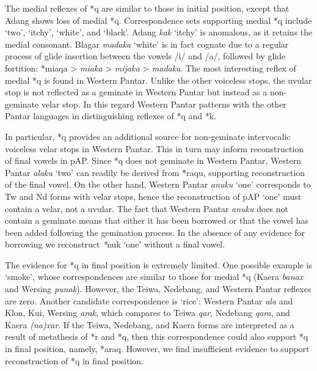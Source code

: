 The medial reflexes of *q are similar to those in initial position, except that Adang shows loss of medial *q. Correspondence sets supporting medial *q include {\textquoteleft}two{\textquoteright}, {\textquoteleft}itchy{\textquoteright}, {\textquoteleft}white{\textquoteright}, and {\textquoteleft}black{\textquoteright}. Adang \textit{kak }{\textquoteleft}itchy{\textquoteright} is anomalous, as it retains the medial consonant. Blagar \textit{mad}\textit{{\textyogh}}\textit{aka} {\textquoteleft}white{\textquoteright} is in fact cognate due to a regular process of glide insertion between the vowels /i/ and /a/, followed by glide fortition: *miaqa {\textgreater} \textit{miaka} {\textgreater} \textit{mijaka} {\textgreater}  \textit{mad}\textit{{\textyogh}}\textit{aka}. The most interesting reflex of medial *q is found in Western Pantar. Unlike the other voiceless stops, the uvular stop is not reflected as a geminate in Western Pantar but instead as a non-geminate velar stop. In this regard Western Pantar patterns 
with the other Pantar languages in distinguishing reflexes of *q and *k.   

In particular, *q provides an additional source for non-geminate intervocalic voiceless velar stops in Western Pantar. This in turn may inform reconstruction of final vowels in pAP. Since *q does not geminate in Western Pantar, Western Pantar \textit{alaku} {\textquoteleft}two{\textquoteright} can readily be derived from *raqu, supporting reconstruction of the final vowel. On the other hand, Western Pantar \textit{anuku} {\textquoteleft}one{\textquoteright} corresponds to Tw and Nd forms with velar stops, hence the reconstruction of pAP {\textquoteleft}one{\textquoteright} must contain a velar, not a uvular. The fact that Western Pantar \textit{anuku }does not contain a geminate means that either it has been borrowed or that the vowel has been added following the gemination process. In the absence of any evidence for borrowing we reconstruct \textit{*}nuk {\textquoteleft}one{\textquoteright} without a final vowel.

The evidence for *q in final position is extremely limited. One possible example is {\textquoteleft}smoke{\textquoteright}, whose correspondences are similar to those for medial *q (Kaera \textit{banax }and Wersing \textit{punak}). However, the Teiwa, Nedebang, and Western Pantar reflexes are zero. Another candidate correspondence is {\textquoteleft}rice{\textquoteright}: Western Pantar \textit{ala} and Klon, Kui, Wersing \textit{arak}, which compares to Teiwa \textit{qar}, Nedebang \textit{qara}, and Kaera \textit{(na)xar}. If the Teiwa, Nedebang, and Kaera forms are interpreted as a result of metathesis of *r and *q, then this correspondence could also support *q in final position, namely, *araq. However, we find insufficient evidence to support reconstruction of *q in final position.

